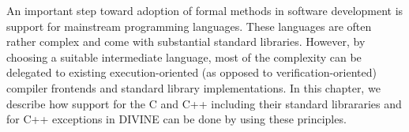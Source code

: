 

\bigskip\noindent
An important step toward adoption of formal methods in software development is
support for mainstream programming languages.
These languages are often rather complex and come with substantial standard
libraries.
However, by choosing a suitable intermediate language, most of the complexity
can be delegated to existing execution-oriented (as opposed to
verification-oriented) compiler frontends and standard library implementations.
In this chapter, we describe how support for the C and C++ including their
standard librararies and for C++ exceptions in DIVINE can be done by using
these principles.


